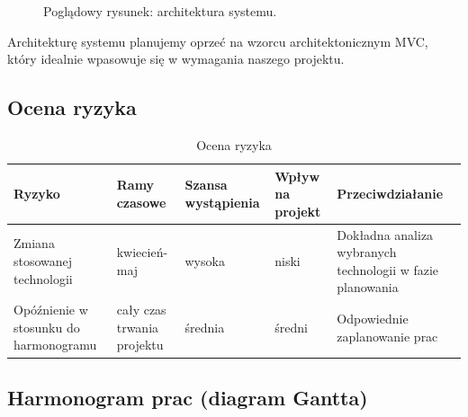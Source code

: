 \documentclass[12pt,a4paper]{report}
\begin{document}
\begin{figure}[H]
\centering
\caption{Poglądowy rysunek: architektura systemu.}
\label{im_overview}
\hspace*{0cm}
\end{figure}

Architekturę systemu planujemy oprzeć na wzorcu architektonicznym MVC, który idealnie wpasowuje się w wymagania naszego projektu.

\subsection{Ocena ryzyka}

\begin{table}[H]
\centering
\hspace{-1cm}
\caption{Ocena ryzyka}
\begin{tabular}{ | p{4cm} | p{2cm} | p{2cm} | p{2cm} | p{4cm} |}
\hline
Ryzyko & Ramy czasowe & Szansa wystąpienia & Wpływ na projekt & Przeciwdziałanie \\ \hline
    Zmiana stosowanej technologii & kwiecień-maj & wysoka & niski & Dokładna analiza wybranych technologii w fazie planowania \\ \hline
	Opóźnienie w stosunku do harmonogramu & cały czas trwania projektu & średnia & średni & Odpowiednie zaplanowanie prac \\ \hline
\end{tabular}
\end{table}

\subsection{Harmonogram prac (diagram Gantta)}

\end{document}
